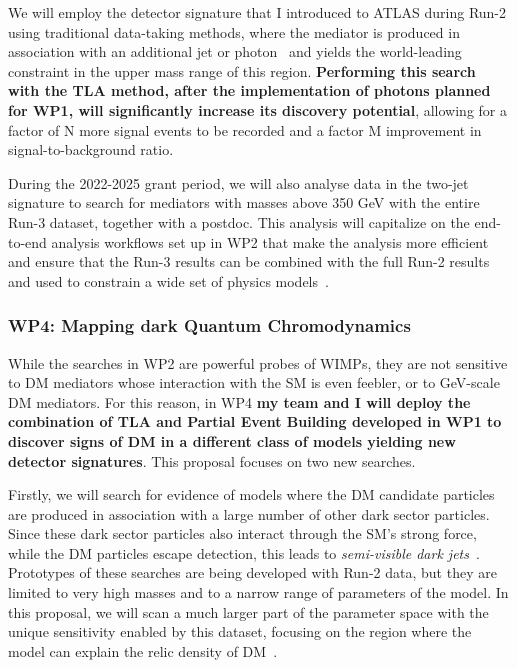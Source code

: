 \documentclass[11pt,a4paper]{article}
\begin{document}
We will employ the detector signature that I introduced to ATLAS during Run-2 using traditional data-taking methods, where the mediator is produced in association with an additional jet or photon~\cite{Aaboud:2019zxd} and yields the world-leading constraint in the upper mass range of this region. 
\textbf{Performing this search with the TLA method, after the implementation of photons planned for WP1, will significantly increase its discovery potential}, 
allowing for a factor of \color{red}N \color{black} more signal events to be recorded and a factor \color{red}M \color{black} improvement in signal-to-background ratio. 

During the 2022-2025 grant period, we will also analyse data in the two-jet signature to search for mediators with masses above 350 GeV with the entire Run-3 dataset, together with a postdoc. 
This analysis will capitalize on the end-to-end analysis workflows set up in WP2 that make the analysis more efficient and ensure that the Run-3 results can be combined with the full Run-2 results and used to constrain a wide set of physics models~\cite{Kim:2019rhy}.   

\subsubsection*{WP4: Mapping dark Quantum Chromodynamics}

While the searches in WP2 are powerful probes of WIMPs, they are not sensitive to DM mediators whose interaction with the SM is even feebler, or to GeV-scale DM mediators. 
For this reason, in WP4 \textbf
{my team and I will deploy the combination of TLA and Partial Event Building developed in WP1 to discover signs of DM in a different class of models yielding new detector signatures}. 
This proposal focuses on two new searches.  

Firstly, we will search for evidence of models where the DM candidate particles are produced in association with a large number of other dark sector particles. 
Since these dark sector particles also interact through the SM's strong force, while the DM particles escape detection, this leads to \textit{semi-visible dark jets}~\cite{Cohen:2017pzm}.
Prototypes of these searches are being developed with Run-2 data, but they are limited to very high masses and to a narrow range of parameters of the model. 
In this proposal, we will scan a much larger part of the parameter space with the unique sensitivity enabled by this dataset, focusing on the region where the model can explain the relic density of DM~\cite{Bernreuther:2019pfb}. 
\end{document}

